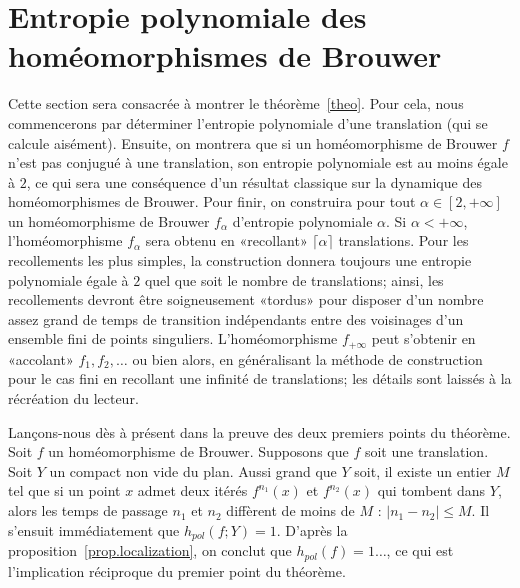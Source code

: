 \documentclass[11pt]{article}
\providecommand{\og}{«\nobreakspace}
\providecommand{\fg}{\nobreakspace»}
\theoremstyle{definition}
\numberwithin{equation}{section}
\numberwithin{figure}{section}
\numberwithin{table}{section}
\begin{document}
\section{Entropie polynomiale des homéomorphismes de Brouwer}\label{s.brouwer}

Cette section sera consacrée à montrer le théorème~\ref{theo}. Pour cela, nous commencerons par déterminer l'entropie polynomiale d'une translation (qui se calcule aisément). Ensuite, on montrera que si un homéomorphisme de Brouwer $f$ n'est pas conjugué à une translation, son entropie polynomiale est {au moins égale à} $2$, {ce qui sera} une conséquence d'un résultat classique sur la dynamique des homéomorphismes de Brouwer. Pour finir, on construira pour tout $\alpha \in [2,+\infty]$ un homéomorphisme de Brouwer $f_\alpha$ d'entropie polynomiale $\alpha$. Si $\alpha< +\infty$, l'homéomorphisme $f_{\alpha}$ sera obtenu en \og recollant\fg{} $\lceil \alpha\rceil$ translations. Pour les recollements les plus simples, la construction donnera toujours une entropie polynomiale égale à $2$ quel que soit le nombre de translations; ainsi, les recollements devront être soigneusement \og tordus\fg{} pour disposer d'un nombre assez grand de temps de transition indépendants entre des voisinages d'un ensemble fini de points singuliers. L'homéomorphisme $f_{+\infty}$ peut s'obtenir en \og accolant\fg{} $f_1, f_2, \dots$ ou bien alors, en généralisant la méthode de construction pour le cas fini en recollant une infinité de translations; les détails sont laissés à la récréation du lecteur.


Lançons-nous dès à présent dans la preuve des deux premiers points du théorème. Soit $f$ un homéomorphisme de Brouwer. Supposons que $f$ soit une translation. Soit $Y$ un compact non vide du plan. Aussi grand que $Y$ soit, il existe un entier $M$ tel que si un point $x$ admet deux itérés $f^{n_1}(x)$ et $f^{n_2}(x)$ qui tombent dans $Y$, alors les temps de passage $n_1$ et $n_2$ diffèrent de moins de $M$ : $|n_1-n_2|\leq M$. Il s'ensuit immédiatement que $h_{pol}(f;Y) = 1$. D'après la proposition~\ref{prop.localization}, on conclut que $h_{pol}(f) = 1\dots$, ce qui est l'implication réciproque du premier point du théorème.
\end{document}
